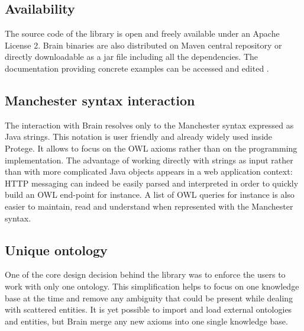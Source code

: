 \documentclass{llncs}
\begin{document}
\subsection{Availability}
The source code of the library is open and freely available \cite{github} under an Apache License 2.
Brain binaries are also distributed on Maven central repository or directly downloadable as a jar file including all the dependencies.
The documentation providing concrete examples can be accessed and edited \cite{wiki}.

\subsection{Manchester syntax interaction}
The interaction with Brain resolves only to the Manchester syntax \cite{Horridge2006} expressed as Java strings.
This notation is user friendly and already widely used inside Protege. It allows to focus on the OWL axioms rather than on the programming implementation.
The advantage of working directly with strings as input rather than with more complicated Java objects appears in a web application context:
HTTP messaging can indeed be easily parsed and interpreted in order to quickly build an OWL end-point for instance.
A list of OWL queries for instance is also easier to maintain, read and understand when represented with the Manchester syntax.

\subsection{Unique ontology}
One of the core design decision behind the library was to enforce the users to work with only one ontology.
This simplification helps to focus on one knowledge base at the time and remove any ambiguity that could be present while
dealing with scattered entities. It is yet possible to import and load external ontologies
and entities, but Brain merge any new axioms into one single knowledge base.
\end{document}
